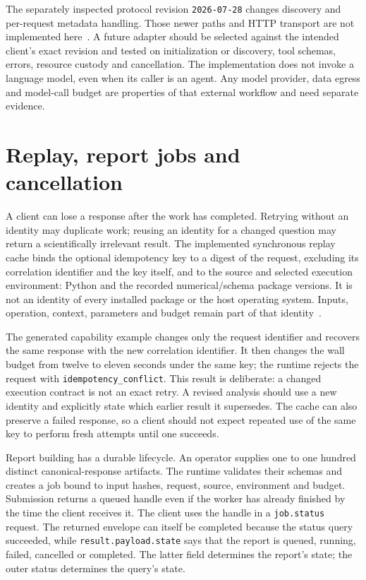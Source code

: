 The separately inspected protocol revision \texttt{2026-07-28} changes
discovery and per-request metadata handling. Those newer paths and HTTP
transport are not implemented here~\citep{v12_mcp_versioning,v12_mcp_basic}.
A future adapter should be selected against the intended client's exact
revision and tested on initialization or discovery, tool schemas, errors,
resource custody and cancellation. The implementation does not invoke a
language model, even when its caller is an agent. Any model provider, data
egress and model-call budget are properties of that external workflow and
need separate evidence.

\section{Replay, report jobs and cancellation}

A client can lose a response after the work has completed. Retrying without
an identity may duplicate work; reusing an identity for a changed question
may return a scientifically irrelevant result. The implemented synchronous
replay cache binds the optional idempotency key to a digest of the request,
excluding its correlation identifier and the key itself, and to the source
and selected execution environment: Python and the recorded numerical/schema
package versions. It is not an identity of every installed package or the
host operating system. Inputs, operation, context, parameters and budget
remain part of that identity~\citep{exec13_i2_examples}.

The generated capability example changes only the request identifier and
recovers the same response with the new correlation identifier. It then
changes the wall budget from twelve to eleven seconds under the same key;
the runtime rejects the request with \texttt{idempotency\_conflict}.
This result is deliberate: a changed execution contract is not an exact
retry. A revised analysis should use a new identity and explicitly state
which earlier result it supersedes. The cache can also preserve a failed
response, so a client should not expect repeated use of the same key to
perform fresh attempts until one succeeds.

Report building has a durable lifecycle. An operator supplies one to one
hundred distinct canonical-response artifacts. The runtime validates their
schemas and creates a job bound to input hashes, request, source, environment
and budget. Submission returns a queued handle even if the worker has
already finished by the time the client receives it. The client uses the
handle in a \texttt{job.status} request. The returned envelope can itself
be completed because the status query succeeded, while
\texttt{result.payload.state} says that the report is queued, running,
failed, cancelled or completed. The latter field determines the report's
state; the outer status determines the query's state.

